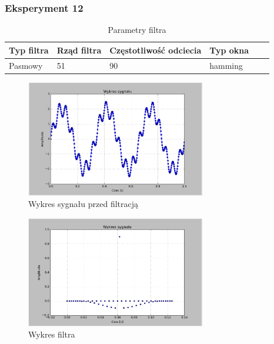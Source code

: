 \documentclass{article}
\begin{document}
{        \subsubsection{Eksperyment 12} {
            \begin{table}[h!]
            \centering
            \begin{tabular}{|l|l|l|l|l|l|}
            \hline
            Typ filtra & Rząd filtra & Częstotliwość odciecia & Typ okna  \\\hline
            Pasmowy & 51 & 90 & hamming     \\\hline
            \end{tabular}
            \caption{Parametry filtra}
            \end{table}
            \begin{figure}[h!]
                \centering
                \includegraphics[width=0.7\textwidth]{img/sig.png}
                \caption{Wykres sygnału przed filtracją}
            \end{figure}
            \begin{figure}[h!]
                \centering
                \includegraphics[width=0.7\textwidth]{img/fil23.png}
                \caption{Wykres filtra}
            \end{figure}

}}
\end{document}
